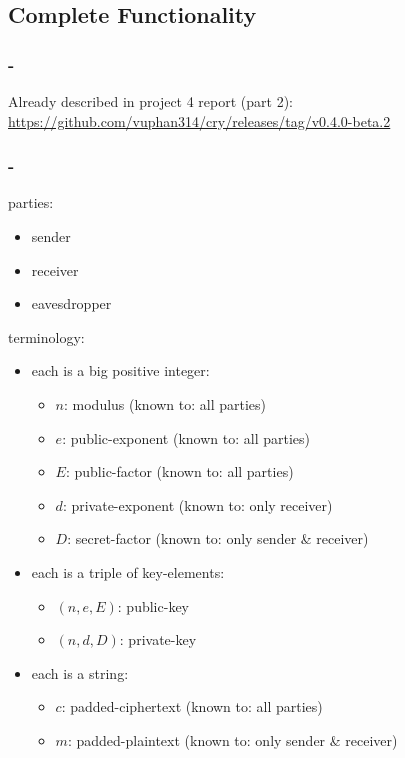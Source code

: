 \subsection{Complete Functionality}


\subsubsection{\rsa-\cs}

Already described in project 4 report (part 2):
\url{https://github.com/vuphan314/cry/releases/tag/v0.4.0-beta.2}


\subsubsection{\dummy-\cs}

parties:
\begin{itemize}
\item sender
\item receiver
\item eavesdropper
\end{itemize}

terminology:
\begin{itemize}
\item each  is a big positive integer:
  \begin{itemize}
  \item $n$: modulus (known to: all parties)
  \item $e$: public-exponent (known to: all parties)
  \item $E$: public-factor (known to: all parties)
  \item $d$: private-exponent (known to: only receiver)
  \item $D$: secret-factor
    (known to: only sender \& receiver)
  \end{itemize}
\item each  is a triple of key-elements:
  \begin{itemize}
  \item $(n, e, E)$: public-key
  \item $(n, d, D)$: private-key
  \end{itemize}
\item each  is a string:
  \begin{itemize}
  \item $c$: padded-ciphertext (known to: all parties)
  \item $m$: padded-plaintext
    (known to: only sender \& receiver)
  \end{itemize}
\end{itemize}

